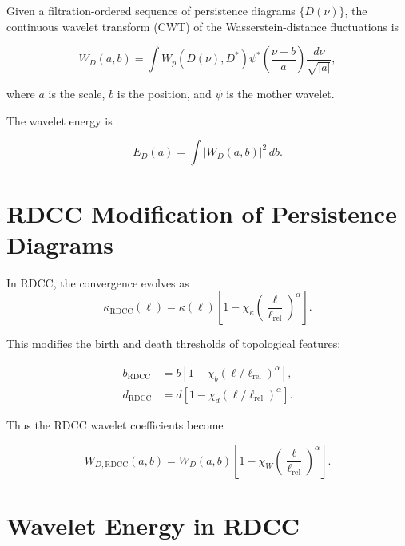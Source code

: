 \documentclass[11pt,a4paper]{article}
\begin{document}
Given a filtration-ordered sequence of persistence diagrams $\{D(\nu)\}$, the 
continuous wavelet transform (CWT) of the Wasserstein-distance fluctuations is

\begin{equation}
    W_{D}(a, b)
    = \int
      W_{p}(D(\nu), D^{*})
      \psi^{*}\!\left(\frac{\nu - b}{a}\right)
      \frac{d\nu}{\sqrt{|a|}},
\end{equation}

where $a$ is the scale, $b$ is the position, and $\psi$ is the mother wavelet.

The wavelet energy is

\begin{equation}
    E_{D}(a)
    = \int |W_{D}(a, b)|^{2} \, db.
\end{equation}
\section{RDCC Modification of Persistence Diagrams}

In RDCC, the convergence evolves as
\begin{equation}
    \kappa_{\mathrm{RDCC}}(\ell)
    = \kappa(\ell)
      \left[
        1 - \chi_{\kappa}
        \left(\frac{\ell}{\ell_{\mathrm{rel}}}\right)^{\alpha}
      \right].
\end{equation}

This modifies the birth and death thresholds of topological features:

\begin{align}
    b_{\mathrm{RDCC}} &= b \left[ 1 - \chi_{b} (\ell/\ell_{\mathrm{rel}})^{\alpha} \right], \\
    d_{\mathrm{RDCC}} &= d \left[ 1 - \chi_{d} (\ell/\ell_{\mathrm{rel}})^{\alpha} \right].
\end{align}

Thus the RDCC wavelet coefficients become

\begin{equation}
    W_{D,\mathrm{RDCC}}(a, b)
    = W_{D}(a, b)
      \left[
        1 - \chi_{W}
        \left(\frac{\ell}{\ell_{\mathrm{rel}}}\right)^{\alpha}
      \right].
\end{equation}
\section{Wavelet Energy in RDCC}
\end{document}
